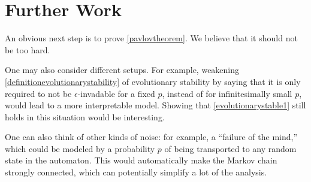 \documentclass[11pt]{amsart}
\theoremstyle{definition}
\newtheorem{lemma}[theorem]{Lemma}
\theoremstyle{remark}
\begin{document}
    \section{Further Work}
    \label{sectiondiscussion}

    An obvious next step is to prove \cref{pavlovtheorem}. We believe that it should not be too hard.

    One may also consider different setups. For example, weakening \cref{definitionevolutionarystability} of evolutionary stability by saying that it is only required to not be $\epsilon$-invadable for a fixed $p$, instead of for infinitesimally small $p$, would lead to a more interpretable model. Showing that \cref{evolutionarystable1} still holds in this situation would be interesting.
    
    One can also think of other kinds of noise: for example, a ``failure of the mind,'' which could be modeled by a probability $p$ of being transported to any random state in the automaton. This would automatically make the Markov chain strongly connected, which can potentially simplify a lot of the analysis.









\end{document}
